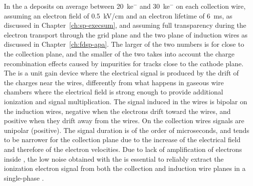 In the   a  deposits on average between
\SI{20}{k}{e$^-$} and \SI{30}{k}{e$^-$} on each collection wire, assuming an electron field
of \SI{0.5}{kV/cm} and an electron lifetime of \SI{6}{ms}, as discussed in
Chapter~\ref{ch:sp-execsum}, and assuming full transparency during the 
electron transport through the grid plane and the two plane of induction
wires as discussed in Chapter~\ref{ch:fdsp-apa}. The larger of the two numbers 
is for  close to the collection plane, and the smaller of the two
takes into account the charge recombination effects caused by impurities for 
tracks close to the cathode plane. The    is 
a unit gain device where the electrical signal is produced by the drift of the
charges near the wires, differently from what happens in gaseous wire 
chambers where the electrical field is strong enough to provide additional
ionization and signal multiplication. The signal induced in the 
 wires is bipolar on the induction wires, negative when the
electrons drift toward the wires, and positive when they drift away from
the wires. On the collection wires signals are unipolar (positive).
The signal duration is of the order of microseconds, and tends to be narrower
for the collection plane due to the increase of the electrical field and
therefore of the electron velocities. Due to lack of amplification of 
electrons inside , the low noise obtained with the  is
essential to reliably extract the ionization electron signal from both the 
collection and induction wire planes in a single-phase  .

